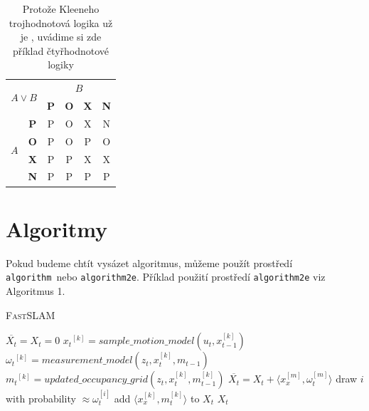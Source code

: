 \documentclass[a4paper, 11pt, times]{article}
\begin{document}
\begin{table}[h]
\begin{center}
  \begin{tabular}{ |c|c|c|c|c|c| }
  \hline
  \multicolumn{2}{|c}{\multirow{2}{*}{$A \lor B$ }} & \multicolumn{4}{|c|}{$B$} \\ \cline{3-6}
    \multicolumn{2}{|c|}{} &   \textbf{P}  & \textbf{O}  & \textbf{X}  & \textbf{N} \\ \hline
    \multirow{4}{*}{$A$} & \textbf{P} & P & O & X & N \\ \cline{2-6}
    &                      \textbf{O} & P & O & P & O \\ \cline{2-6}
    &                      \textbf{X} & P & P & X & X \\ \cline{2-6}
    &                      \textbf{N} & P & P & P & P \\ \hline
  \end{tabular}
\caption{Protože Kleeneho trojhodnotová logika už je , uvádime
          si zde příklad čtyřhodnotové logiky}
\label{tab:big_table}
\end{center}
\end{table} %


\newpage




\section{Algoritmy}
Pokud budeme chtít vysázet algoritmus, můžeme použít prostředí \texttt{algorithm}\footnotemark[2] \ nebo \texttt{algorithm2e}\footnotemark[3].
Příklad použití prostředí \texttt{algorithm2e} viz Algoritmus 1.\\


\begin{algorithm}[H]
	\caption{\textsc{FastSLAM}}
  \label{alg:algoritmus}


	\BlankLine
	\Indp\Indp
	 \begin{algorithmic}[1]
		\STATE $ \overline{X_t}=X_t=0$
		    \STATE ${x_t}^{[k]}=sample\_motion\_model(u_t,x_{t-1}^{[k]})$
		    \STATE ${\omega_t}^{[k]}=measurement\_model(z_t,x_t^{[k]},m_{t-1})$
		    \STATE ${m_t}^{[k]}=updated\_occupancy\_grid(z_t,x_{t}^{[k]},m_{t-1}^{[k]})$
		    \STATE $\overline{X_t}=X_t +\langle x_x^{[m]}, \omega_t^{[m]}\rangle$
		\ENDFOR
		    \STATE draw $i$ with probability $ \approx \omega_t^{[i]}$
		    \STATE add $\langle x_x^{[k]},m_t^{[k]}\rangle $ to $X_t$
		\ENDFOR
		\RETURN $X_t$
\end{algorithmic}
\end{algorithm}
\end{document}
